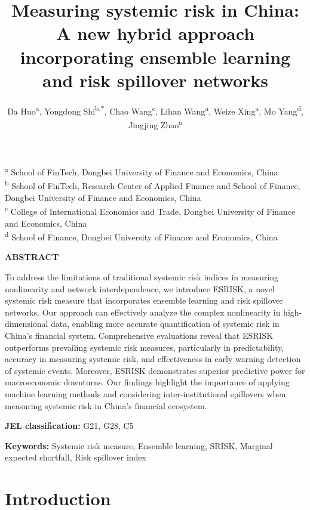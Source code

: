 \documentclass[12pt,a4paper]{article}
\title{Measuring systemic risk in China: A new hybrid approach incorporating ensemble learning and risk spillover networks}
\author{
        Da Huo\textsuperscript{a}, 
        Yongdong Shi\textsuperscript{b,*}, 
        Chao Wang\textsuperscript{c}, 
        Lihan Wang\textsuperscript{a}, 
        Weize Xing\textsuperscript{a}, 
        Mo Yang\textsuperscript{d}, 
        Jingjing Zhao\textsuperscript{a}
    }
\date{}
\begin{document}
    \maketitle

    \begin{center}
        \textsuperscript{a} School of FinTech, Dongbei University of Finance and Economics, China \\
        \textsuperscript{b} School of FinTech, Research Center of Applied Finance and School of Finance, Dongbei University of Finance and Economics, China \\
        \textsuperscript{c} College of International Economics and Trade, Dongbei University of Finance and Economics, China \\
        \textsuperscript{d} School of Finance, Dongbei University of Finance and Economics, China \\
    \end{center}

    \begin{center}
        \textbf{ABSTRACT}
    \end{center}

    To address the limitations of traditional systemic risk indices in measuring nonlinearity and network interdependence, we introduce ESRISK, a novel systemic risk measure that incorporates ensemble learning and risk spillover networks. Our approach can effectively analyze the complex nonlinearity in high-dimensional data, enabling more accurate quantification of systemic risk in China's financial system. Comprehensive evaluations reveal that ESRISK outperforms prevailing systemic risk measures, particularly in predictability, accuracy in measuring systemic risk, and effectiveness in early warning detection of systemic events. Moreover, ESRISK demonstrates superior predictive power for macroeconomic downturns. Our findings highlight the importance of applying machine learning methods and considering inter-institutional spillovers when measuring systemic risk in China's financial ecosystem.

    \textbf{JEL classification:} G21, G28, C5

    \textbf{Keywords:} Systemic risk measure, Ensemble learning, SRISK, Marginal expected shortfall, Risk spillover index

    \section{Introduction}
\end{document}
